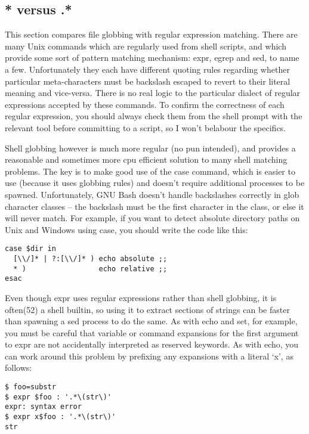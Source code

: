 \subsection{* versus .*}

This section compares file globbing with regular expression matching. There are many Unix commands which are regularly used from shell scripts, and which provide some sort of pattern matching mechanism: expr, egrep and sed, to name a few. Unfortunately they each have different quoting rules regarding whether particular meta-characters must be backslash escaped to revert to their literal meaning and vice-versa. There is no real logic to the particular dialect of regular expressions accepted by these commands. To confirm the correctness of each regular expression, you should always check them from the shell prompt with the relevant tool before committing to a script, so I won't belabour the specifics.

Shell globbing however is much more regular (no pun intended), and provides a reasonable and sometimes more cpu efficient solution to many shell matching problems. The key is to make good use of the case command, which is easier to use (because it uses globbing rules) and doesn't require additional processes to be spawned. Unfortunately, GNU Bash doesn't handle backslashes correctly in glob character classes -- the backslash must be the first character in the class, or else it will never match. For example, if you want to detect absolute directory paths on Unix and Windows using case, you should write the code like this: 

\begin{Verbatim}[frame=single]
case $dir in
  [\\/]* | ?:[\\/]* ) echo absolute ;;
  * )                 echo relative ;;
esac
\end{Verbatim}

Even though expr uses regular expressions rather than shell globbing, it is often(52) a shell builtin, so using it to extract sections of strings can be faster than spawning a sed process to do the same. As with echo and set, for example, you must be careful that variable or command expansions for the first argument to expr are not accidentally interpreted as reserved keywords. As with echo, you can work around this problem by prefixing any expansions with a literal `x', as follows:

\begin{Verbatim}[frame=single]
$ foo=substr
$ expr $foo : '.*\(str\)'
expr: syntax error
$ expr x$foo : '.*\(str\)'
str
\end{Verbatim}

